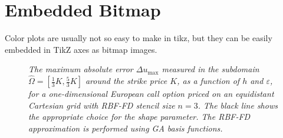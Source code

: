 \documentclass[11pt, oneside]{article}   	%
\begin{document}
\newpage
\section{Embedded Bitmap}
Color plots are usually not so easy to make in tikz, but they can be easily embedded in TikZ axes as bitmap images. 
\begin{figure}[H]
\centering


\caption{\emph{The maximum absolute error $\Delta u_{\max}$ measured in the subdomain $\hat\Omega=[\frac{1}{3}K,\frac{5}{3}K]$ around the strike price $K$, as a function of $h$ and $\varepsilon$, for a one-dimensional European call option priced on an equidistant Cartesian grid with RBF-FD stencil size $n=3$. The black line shows the appropriate choice for the shape parameter. The RBF-FD approximation is performed using GA basis functions.}}
\label{fig:contour1}
\end{figure}
\end{document}
